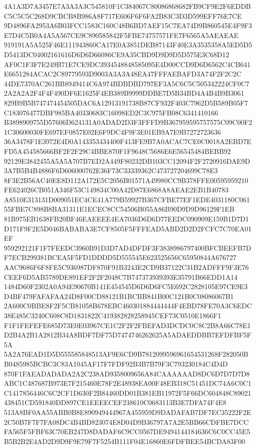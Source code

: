 \documentclass[UTF8,fontset=fandol,zihao=-4,a4paper]{ctexart}
\begin{document}
{{4A1A3D7A3457E7A3A3A3C545810F1C384067C80086868682FB9CF9E2F6EDDBC5C5C5C268D9CBCB8B986A8F717E606F6F6FA2B83C3D3D599EFF76E7CE
9D4896FA2953A6B03FCC1583C160C48B6BD7AEF15C7EA74D9B860545E4F9F3E7D4C5B0A4A5A567CE9C890585842F5FBE74757571FE7F6565A5AEAEAE
919191A5A525F46E111943860CA17E0A3851DEB87143F40E3A3535358A5ED5D5D5413DC04002161616D6D6D66086CE9A35CBD9D9D9D5D575E3C68D12
AF0C1F3F7E249B71E7CE9DC3934548848585095E4D00CCD9D6D6562C4CB641E6651284ACAC2C89779593D9003A3A3A48EA47FFFAEBAFD3A74F2F2C2C
44DE7370AC261BB8949414C6A974BDBDBD797EF3A5C6C5C505342224CF0C72A2A2A2F4F4F490DF6E1625F4EB389B9999DDBE7D5B34BD4A4B4B9B3061
829B9B5B747474454505DAC6A12913191738B87CF932F403C7962D5B589B05F7C183076477DBF985BA40330683C16098ED2C3C975FB08C6341410166
B3898909755D57606D624131A0ADAD2D3F3FFFD9B367959595757575C09C00F21C30600030FE697EF0857E02E6F9DC4F9F3E01EB9A7E9B7272723636
36A3478F1E3972E4D0A143353434400F413FE9B7A0ACAC7CE0C0018A2EBD7EFD5A454585666BF2F2F29C4BBE870F1F9648C5686E6E56545484BEBB92
92129E3842455A5A5A707B7ED2A449F80232DB103CC12094F2F2720916DAE9D3A7B5B4B4886F6D606000762E36F73C33339362C473727204699C78E3
8F3E2B56AC40EE8D112A172E5C2056B01571A49980CC9B378FFE00595959210FE624026CB051A346F53C149834C00A42D87E6868A8AEAE2EB1B40783
A8510E313131D009051EC4CE41A779B59927B367CFBE77EF1EDE4031180C06155FBE7C898B8BA31311E1ECEC8CC54506B055A86B90D9D9D96129F1EB
81B975EB1638FB20BF46EAEEEE4EA7036D6D6D77EEDC090909E159B1D7D1D171F9F2E5D046BABABA3E7CF8505F5FFFEAD5ABD2D2D2FCFC7C70EA01EF
959292121F1F7FEEDC3960B91D3D7AD4DFDF3F3838986797400BFCBEEFB7DF7ECB299381BCEA5F5FD1DDDD5D555545E623525656C65950844A676727
AAC9686F6F8FE5C936987DF870F91B3243E2CD9B37122C31B2ADFFF9F3E76CEEF6D5AB5789DE891EF2F2F2048C7B747373939393E35791B66EDD1A14
1484D60F2302A0A94E90670B141E454545D6D6D6FC5E692C2828105E97CE9E3D4BF479FAFAFAA24D8F00CD88121B1BCBB841B00C121B0C08086067B1
2A600C0BBE8F2F5CB81058B678EBC460301884444444F4EBD78FE70A3C6EDC38E485C3240C608C8D1831822C419382828258945CEF73C0510E1866F1
F1F1FEFEFE685D73E0E03967CE1C2F2F2FBEFAD3DCDC0C8C2B8A66C78E1D2B4A2B1A2812B34A8BDF7DF75D7474746262625A5ADAEDDBB7EFDFBF5F5A
5A2A76EAD1D5D555585848513AF9E6CD9B7812099596961654531268F282050BB0485985BCBC3C83A1045AF17F7FDF92B3B7B79F3C793230184C4D4D
870F1FAEADADADA2A2C238AD9358009656A84CAAAAAAD8DC6D7D7D7D8ABC1C487687B973E7F215460E78F2E48938EA00F48EB318C51451DC74A6C0C1
C1417856446C6C2CF1D630F2B84460DD01B381EB11972F5F66DC604848C89021438451CD591840DD897CE1EEEECEF238610C0683113B3E7DFA74F4E8
513A8BF0AA55ABB0B8E890949444967A455959D9DADAFAB7DF7EC35222F2E2C50B7F7F7FA08DC4B4BD823074E8D04D9B36797A7A2E5BB66CDFBE7DCC
FA565F5FBF63C70EB247D8DADAF6C9CC0567DE9494144184636C6C0CC45E5B5B2B2E4AD2D9D9F9E79F7F5254B111F04E16860E6FDFBEE54BCDA83F00
}}
\end{document}

